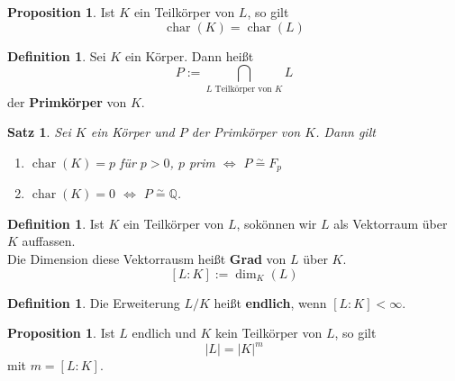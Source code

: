 \documentclass[10pt,a4paper]{article}
\newcommand{\Q}{\ensuremath{\mathbb{Q}}}
\newcommand{\abs}[1]{\left|#1\right|}
\newcommand{\cha}{\operatorname{char}}
\newcommand{\isom}{\overset{\sim}{=}}
\theoremstyle{plain}
\newtheorem{satz}[theorem]{Satz}
\theoremstyle{definition}
\newtheorem{definition}[theorem]{Definition}
\newtheorem{prop}[theorem]{Proposition}
\theoremstyle{remark}
\begin{document}
	\begin{prop}
		Ist $K$ ein Teilkörper von $L$, so gilt
		\[\cha(K)=\cha(L)\]
	\end{prop}

	\begin{definition}
		Sei $K$ ein Körper. Dann heißt
		\[P:=\bigcap_{\text{$L$ Teilkörper von $K$}}L\]
		der \textbf{Primkörper} von $K$.
	\end{definition}

	\begin{satz}
		Sei $K$ ein Körper und $P$ der Primkörper von $K$. Dann gilt
		\begin{enumerate}
			\item $\cha(K)=p$ für $p>0$, $p$ prim $\Leftrightarrow$ $P\isom F_p$
			\item $\cha(K)=0$ $\Leftrightarrow$ $P\isom\Q$.
		\end{enumerate}
	\end{satz}

	\begin{definition}
		Ist $K$ ein Teilkörper von $L$, sokönnen wir $L$ als Vektorraum über $K$ auffassen.\\
		Die Dimension diese Vektorrausm heißt \textbf{Grad} von $L$ über $K$.
		\[[L:K]:=\dim_K(L)\]
	\end{definition}

	\begin{definition}
		Die Erweiterung $L/K$ heißt \textbf{endlich}, wenn $[L:K]<\infty$.\\
	\end{definition}

	\begin{prop}
		Ist $L$ endlich und $K$ kein Teilkörper von $L$, so gilt \[\abs{L}=\abs{K}^m\]
		mit $m=[L:K]$.
	\end{prop}
\end{document}
